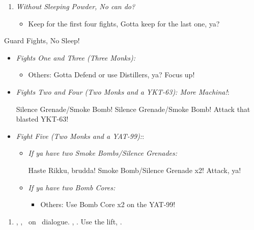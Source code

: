 \begin{enumerate}[resume]
\item \textit{Without Sleeping Powder, No can do?}
\begin{itemize}
\item Keep \formation{\tidus}{\rikku}{\lulu} for the first four fights, Gotta keep \formation{\tidus}{\rikku}{\kimahri} for the last one, ya?
\end{itemize}
\end{enumerate}
\begin{battle}{Guard Fights, No Sleep!}
\begin{itemize}
\item \textit{Fights One and Three (Three Monks):}
\begin{itemize}
\tidusf Attack, ya! Show em' what you've got, brudda!
\item Others: Gotta Defend or use Distillers, ya? Focus up!
\end{itemize}
\item \textit{Fights Two and Four (Two Monks and a YKT-63): More Machina!}:
\begin{itemize}
\switch{\tidus}{\kimahri}
\kimahrif Silence Grenade/Smoke Bomb!
\rikkuf Silence Grenade/Smoke Bomb!
\switch{\kimahri}{\tidus}
\tidusf Attack that blasted YKT-63!
\end{itemize}
\item \textit{Fight Five (Two Monks and a YAT-99):}:
\begin{itemize}
\item \textit{If ya have two Smoke Bombs/Silence Grenades:}
\begin{itemize}
\tidusf Haste Rikku, brudda!
\rikkuf Smoke Bomb/Silence Grenade x2!
\tidusf Attack, ya!
\end{itemize}
\item \textit{If ya have two Bomb Cores:}
\begin{itemize}
\tidusf Attack the Monks!
\item Others: Use Bomb Core x2 on the YAT-99!
\end{itemize}
\end{itemize}
\end{itemize}
\end{battle}
\begin{enumerate}[resume]
\item \sd, \skippablefmv[1:30], \sd\ on \yuna\ dialogue. \skippablefmv[30], \sd. Use the lift, \sd.
\end{enumerate}
